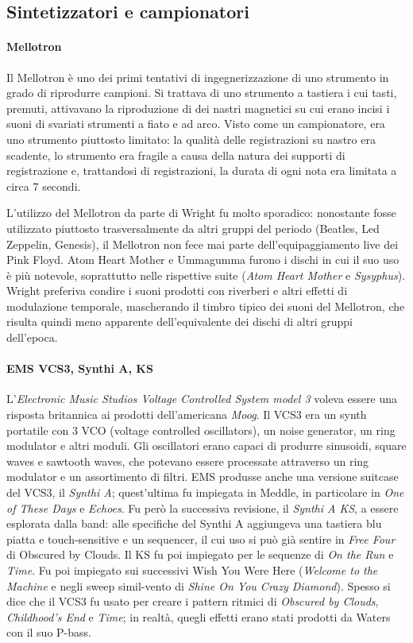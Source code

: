 \documentclass[class=book, crop=false, oneside, 12pt]{standalone}
\begin{document}
    \subsection{Sintetizzatori e campionatori}
    \paragraph{Mellotron}
    Il Mellotron è uno dei primi tentativi di ingegnerizzazione di uno strumento in grado di riprodurre campioni. Si trattava di uno strumento a tastiera i cui tasti, premuti, attivavano la riproduzione di dei nastri magnetici su cui erano incisi i suoni di svariati strumenti a fiato e ad arco. Visto come un campionatore, era uno strumento piuttosto limitato: la qualità delle registrazioni su nastro era scadente, lo strumento era fragile a causa della natura dei supporti di registrazione e, trattandosi di registrazioni, la durata di ogni nota era limitata a circa 7 secondi.

    L'utilizzo del Mellotron da parte di Wright fu molto sporadico: nonostante fosse utilizzato piuttosto trasversalmente da altri gruppi del periodo (Beatles, Led Zeppelin, Genesis), il Mellotron non fece mai parte dell'equipaggiamento live dei Pink Floyd. Atom Heart Mother e Ummagumma furono i dischi in cui il suo uso è più notevole, soprattutto nelle rispettive suite (\emph{Atom Heart Mother} e \emph{Sysyphus}). Wright preferiva condire i suoni prodotti con riverberi e altri effetti di modulazione temporale, mascherando il timbro tipico dei suoni del Mellotron, che risulta quindi meno apparente dell'equivalente dei dischi di altri gruppi dell'epoca.

    \paragraph{EMS VCS3, Synthi A, KS}
    L'\emph{Electronic Music Studios Voltage Controlled System model 3} voleva essere una risposta britannica ai prodotti dell'americana \emph{Moog}. Il VCS3 era un synth portatile con 3 VCO (voltage controlled oscillators), un noise generator, un ring modulator e altri moduli. Gli oscillatori erano capaci di produrre sinusoidi, square waves e sawtooth waves, che potevano essere processate attraverso un ring modulator e un assortimento di filtri. EMS produsse anche una versione suitcase del VCS3, il \emph{Synthi A}; quest'ultima fu impiegata in Meddle, in particolare in \emph{One of These Days} e \emph{Echoes}. Fu però la successiva revisione, il \emph{Synthi A KS}, a essere esplorata dalla band: alle specifiche del Synthi A aggiungeva una tastiera blu piatta e touch-sensitive e un sequencer, il cui uso si può già sentire in \emph{Free Four} di Obscured by Clouds. Il KS fu poi impiegato per le sequenze di \emph{On the Run} e \emph{Time}. Fu poi impiegato sui successivi Wish You Were Here (\emph{Welcome to the Machine} e negli sweep simil-vento di \emph{Shine On You Crazy Diamond}). Spesso si dice che il VCS3 fu usato per creare i pattern ritmici di \emph{Obscured by Clouds}, \emph{Childhood's End} e \emph{Time}; in realtà, quegli effetti erano stati prodotti da Waters con il suo P-bass.
\end{document}
